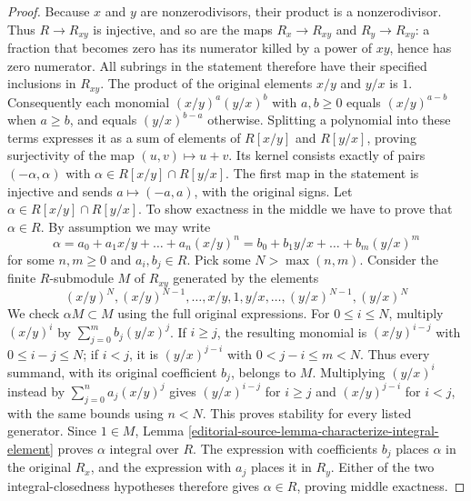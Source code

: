 \begin{proof}
Because $x$ and $y$ are nonzerodivisors, their product is a
nonzerodivisor. Thus $R\to R_{xy}$ is injective, and so are the
maps $R_x\to R_{xy}$ and $R_y\to R_{xy}$: a fraction that becomes
zero has its numerator killed by a power of $xy$, hence has zero
numerator. All subrings in the statement therefore have their
specified inclusions in $R_{xy}$. The product of the original
elements $x/y$ and $y/x$ is $1$. Consequently each monomial
$(x/y)^a(y/x)^b$ with $a,b\geq0$ equals $(x/y)^{a-b}$ when
$a\geq b$, and equals $(y/x)^{b-a}$ otherwise. Splitting a
polynomial into these terms expresses it as a sum of elements
of $R[x/y]$ and $R[y/x]$, proving surjectivity of the map
$(u,v)\mapsto u+v$. Its kernel consists exactly of pairs
$(-\alpha,\alpha)$ with $\alpha\in R[x/y]\cap R[y/x]$.
The first map in the statement is injective and sends
$a\mapsto(-a,a)$, with the original signs.
Let $\alpha \in R[x/y] \cap R[y/x]$. To show exactness in the middle
we have to prove that $\alpha \in R$. By assumption we may write
$$
\alpha = a_0 + a_1 x/y + \ldots + a_n (x/y)^n =
b_0 + b_1 y/x + \ldots + b_m(y/x)^m
$$
for some $n, m \geq 0$ and $a_i, b_j \in R$.
Pick some $N > \max(n, m)$.
Consider the finite $R$-submodule $M$ of $R_{xy}$ generated by the elements
$$
(x/y)^N, (x/y)^{N - 1}, \ldots, x/y, 1, y/x, \ldots, (y/x)^{N - 1}, (y/x)^N
$$
We check $\alpha M\subset M$ using the full original expressions.
For $0\leq i\leq N$, multiply $(x/y)^i$ by
$\sum_{j=0}^m b_j(y/x)^j$. If $i\geq j$, the resulting
monomial is $(x/y)^{i-j}$ with $0\leq i-j\leq N$; if $i<j$,
it is $(y/x)^{j-i}$ with $0<j-i\leq m<N$.
Thus every summand, with its original coefficient $b_j$, belongs
to $M$. Multiplying $(y/x)^i$ instead by
$\sum_{j=0}^n a_j(x/y)^j$ gives $(y/x)^{i-j}$ for $i\geq j$
and $(x/y)^{j-i}$ for $i<j$, with the same bounds using $n<N$.
This proves stability for every listed generator. Since $1\in M$,
Lemma \ref{editorial-source-lemma-characterize-integral-element} proves $\alpha$
integral over $R$. The expression with coefficients $b_j$ places
$\alpha$ in the original $R_x$, and the expression with $a_j$
places it in $R_y$. Either of the two integral-closedness
hypotheses therefore gives $\alpha\in R$, proving middle exactness.


\end{proof}
